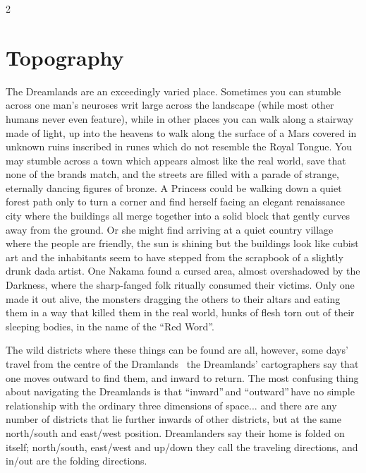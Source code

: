 \begin{multicols}{2}
\section*{Topography}
The Dreamlands are an exceedingly varied place. Sometimes you can stumble across one man's neuroses writ large across the landscape (while most other humans never even feature), while in other places you can walk along a stairway made of light, up into the heavens to walk along the surface of a Mars covered in unknown ruins inscribed in runes which do not resemble the Royal Tongue. You may stumble across a town which appears almost like the real world, save that none of the brands match, and the streets are filled with a parade of strange, eternally dancing figures of bronze. A Princess could be walking down a quiet forest path only to turn a corner and find herself facing an elegant renaissance city where the buildings all merge together into a solid block that gently curves away from the ground. Or she might find arriving at a quiet country village where the people are friendly, the sun is shining but the buildings look like cubist art and the inhabitants seem to have stepped from the scrapbook of a 
slightly drunk dada artist. One Nakama found a cursed area, almost overshadowed by the Darkness, where the sharp-fanged folk ritually consumed their victims. Only one made it out alive, the monsters dragging the others to their altars and eating them in a way that killed them in the real world, hunks of flesh torn out of their sleeping bodies, in the name of the \textquotedblleft Red Word\textquotedblright.

The wild districts where these things can be found are all, however, some days' travel from the centre of the Dramlands \textendash\, the Dreamlands' cartographers say that one moves outward to find them, and inward to return.  The most confusing thing about navigating the Dreamlands is that \textquotedblleft inward\textquotedblright\,and \textquotedblleft outward\textquotedblright\,have no simple relationship with the ordinary three dimensions of space... and there are any number of districts that lie further inwards of other districts, but at the same north/south and east/west position. Dreamlanders say their home is folded on itself; north/south, east/west and up/down they call the traveling directions, and in/out are the folding directions. 


\end{multicols}
